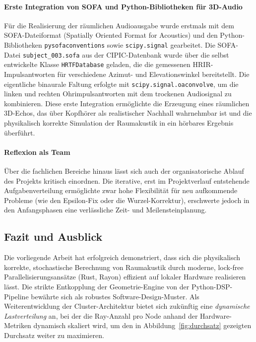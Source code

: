 \paragraph{Erste Integration von SOFA und Python-Bibliotheken für 3D-Audio}
Für die Realisierung der räumlichen Audioausgabe wurde erstmals mit dem SOFA-Dateiformat (Spatially Oriented Format for Acoustics) und den Python-Bibliotheken \texttt{pysofaconventions} sowie \texttt{scipy.signal} gearbeitet. Die SOFA-Datei \texttt{subject\_003.sofa} aus der CIPIC-Datenbank wurde über die selbst entwickelte Klasse \texttt{HRTFDatabase} geladen, die die gemessenen HRIR-Impulsantworten für verschiedene Azimut- und Elevationswinkel bereitstellt.
Die eigentliche binaurale Faltung erfolgte mit \texttt{scipy.signal.oaconvolve}, um die linken und rechten Ohrimpulsantworten mit dem trockenen Audiosignal zu kombinieren. Diese erste Integration ermöglichte die Erzeugung eines räumlichen 3D-Echos, das über Kopfhörer als realistischer Nachhall wahrnehmbar ist und die physikalisch korrekte Simulation der Raumakustik in ein hörbares Ergebnis überführt.

\paragraph{Reflexion als Team}
Über die fachlichen Bereiche hinaus lässt sich auch der organisatorische Ablauf des Projekts kritisch einordnen. Die iterative, erst im Projektverlauf entstehende Aufgabenverteilung ermöglichte zwar hohe Flexibilität für neu aufkommende Probleme (wie den Epsilon-Fix oder die Wurzel-Korrektur), erschwerte jedoch in den Anfangsphasen eine verlässliche Zeit- und Meilensteinplanung.

\subsection{Fazit und Ausblick}
\label{subsec:ausblick}

Die vorliegende Arbeit hat erfolgreich demonstriert, dass sich die physikalisch korrekte, stochastische Berechnung von Raumakustik durch moderne, lock-free Parallelisierungsansätze (Rust, Rayon) effizient auf lokaler Hardware realisieren lässt. Die strikte Entkopplung der Geometrie-Engine von der Python-DSP-Pipeline bewährte sich als robustes Software-Design-Muster.
Als Weiterentwicklung der Cluster-Architektur bietet sich zukünftig eine \emph{dynamische Lastverteilung} an, bei der die Ray-Anzahl pro Node anhand der Hardware-Metriken dynamisch skaliert wird, um den in Abbildung~\ref{fig:durchsatz} gezeigten Durchsatz weiter zu maximieren.
